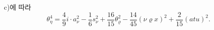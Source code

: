 
c)에 따라
\[
\theta_\eta^4=\frac49i\cdot a_\nu^2-\frac16s_\nu^2+\frac{16}{15}\theta_\varrho^2-\frac{14}{45}(\nu\varrho x)^2+\frac2{15}(atu)^2.
\]
